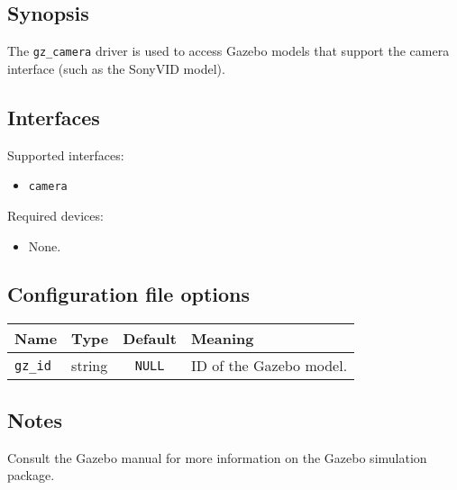 \subsection*{Synopsis}

The {\tt gz\_camera} driver is used to access Gazebo models that
support the camera interface (such as the SonyVID model).

\subsection*{Interfaces}

\noindent Supported interfaces:
\begin{itemize}
\item {\tt camera}
\end{itemize}

\noindent Required devices:
\begin{itemize}
\item None.
\end{itemize}



\subsection*{Configuration file options}

\begin{center}
{\small \begin{tabularx}{\columnwidth}{|l|l|c|X|}
\hline
Name & Type & Default & Meaning\\
\hline
{\tt gz\_id} & string & {\tt NULL} & ID of the Gazebo model. \\
\hline
\end{tabularx}}
\end{center}

\subsection*{Notes}

Consult the Gazebo manual for more information on the Gazebo
simulation package.

